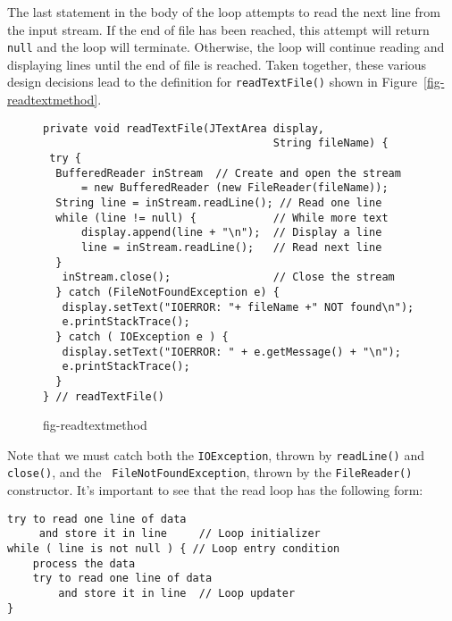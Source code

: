 \noindent The last statement in the body of the loop attempts to read the next
line from the input stream.  If the end of file has been reached, this
attempt will return {\tt null} and the loop will terminate.  Otherwise,
the loop will continue reading and displaying lines until the end of
file is reached.  Taken together, these various design decisions lead to
the definition for {\tt readTextFile()} shown in Figure~\ref{fig-readtextmethod}.
\begin{figure}[h!]
\jjjprogstart
\begin{jjjlisting}
\begin{lstlisting}
private void readTextFile(JTextArea display, 
                                    String fileName) {
 try {
  BufferedReader inStream  // Create and open the stream
      = new BufferedReader (new FileReader(fileName));
  String line = inStream.readLine(); // Read one line
  while (line != null) {            // While more text
      display.append(line + "\n");  // Display a line
      line = inStream.readLine();   // Read next line
  }
   inStream.close();                // Close the stream
  } catch (FileNotFoundException e) {
   display.setText("IOERROR: "+ fileName +" NOT found\n");
   e.printStackTrace();
  } catch ( IOException e ) {
   display.setText("IOERROR: " + e.getMessage() + "\n");
   e.printStackTrace();
  }
} // readTextFile()
\end{lstlisting}
\end{jjjlisting}
{fig-readtextmethod}
\end{figure}

Note that we must catch both the {\tt IOException}, thrown by
{\tt readLine()} and {\tt close()}, and the {\tt
FileNotFoundException}, thrown by the {\tt FileRead\-er()} constructor.
It's important to see that the read loop has the following form:

\begin{jjjlisting}
\begin{lstlisting}
try to read one line of data 
     and store it in line     // Loop initializer
while ( line is not null ) { // Loop entry condition
    process the data
    try to read one line of data 
        and store it in line  // Loop updater
}
\end{lstlisting}
\end{jjjlisting}

